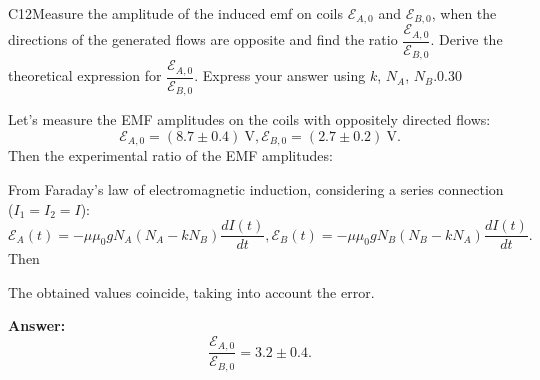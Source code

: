 \documentclass[11pt,a4paper]{article}
\begin{document}
\begin{solcard}{C12}{Measure the amplitude of the induced emf on coils $\mathcal{E}_{A,0}$ and $\mathcal{E}_{B,0}$, when the directions of the generated flows are opposite and find the ratio $\dfrac{\mathcal{E}_{A,0}}{\mathcal{E}_{B,0}}$. Derive the theoretical expression for $\dfrac{\mathcal{E}_{A,0}}{\mathcal{E}_{B,0}}$. Express your answer using $k$, $N_A$, $N_B$.}{0.30}

Let's measure the EMF amplitudes on the coils with oppositely directed flows: $$\mathcal{E}_{A,0}=(8.7\pm0.4)~\mathrm{V},\mathcal{E}_{B,0}=(2.7\pm0.2)~\mathrm{V}.$$ Then the experimental ratio of the EMF amplitudes:


From Faraday's law of electromagnetic induction, considering a series connection ($I_1=I_2=I$): $$\mathcal{E}_A(t)=-\mu\mu_0gN_A(N_A-kN_B)\dfrac{dI(t)}{dt},\mathcal{E}_B(t)=-\mu\mu_0gN_B(N_B-kN_A)\dfrac{dI(t)}{dt}.$$ Then


The obtained values coincide, taking into account the error.

\par\smallskip\noindent\textbf{Answer:} $$\dfrac{\mathcal{E}_{A,0}}{\mathcal{E}_{B,0}}=3.2\pm0.4.$$
\end{solcard}
\end{document}
